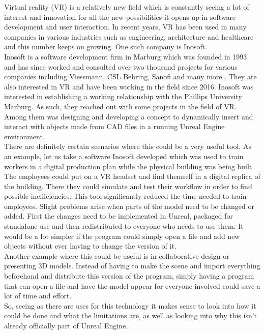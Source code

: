 Virtual reality (\acs{VR}) is a relatively new field which is constantly seeing a lot of interest and innovation for all the new possibilities it opens up in software development and user interaction. In recent years, \acs{VR} has been used in many companies in various industries such as engineering, architecture and healthcare and this number keeps on growing\cite{bib:VRFields}. One such company is Inosoft.\\
Inosoft is a software development firm in Marburg which was founded in 1993 and has since worked and consulted over two thousand projects for various companies including Viessmann, CSL Behring, Sanofi and many more \cite{bib:InosoftAbout}. They are also interested in \acs{VR} and have been working in the field since 2016. Inosoft was interested in establishing a working relationship with the Phillips University Marburg. As such, they reached out with some projects in the field of \acs{VR}. Among them was designing and developing a concept to dynamically insert and interact with objects made from \acs{CAD} files in a running Unreal Engine environment.\\
There are definitely certain scenarios where this could be a very useful tool. As an example, let us take a software Inosoft developed which was used to train workers in a digital production plan while the physical building was being built\cite{bib:InosoftProject}. The employees could put on a VR headset and find themself in a digital replica of the building. There they could simulate and test their workflow in order to find possible inefficiencies. This tool significantly reduced the time needed to train employees. Slight problems arise when parts of the model need to be changed or added. First the changes need to be implemented in Unreal, packaged for standalone use and then redistributed to everyone who needs to use them. It would be a lot simpler if the program could simply open a file and add new objects without ever having to change the version of it.\\
Another example where this could be useful is in collaborative design or presenting 3D models. Instead of having to make the scene and import everything beforehand and distribute this version of the program, simply having a program that can open a file and have the model appear for everyone involved could save a lot of time and effort.\\
So, seeing as there are uses for this technology it makes sense to look into how it could be done and what the limitations are, as well as looking into why this isn't already officially part of Unreal Engine.

